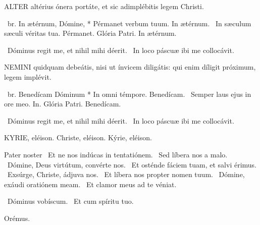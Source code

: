 


\lettrine[lines=2]{A}{LTER} altérius ónera portáte, et sic adimplébitis legem Christi.

\R\ br. In ætérnum, Dómine, * Pérmanet verbum tuum. In ætérnum. \V\ In sæculum sæculi véritas tua. Pérmanet. Glória Patri. In ætérnum.

\V\ Dóminus regit me, et nihil mihi déerit. \R\ In loco páscuæ ibi me collocávit.




\lettrine[lines=2]{N}{EMINI} quidquam debeátis, nisi ut ínvicem diligátis: qui enim díligit próximum, legem implévit.

\R\ br. Benedícam Dóminum * In omni témpore. Benedícam. \V\ Semper laus ejus in ore meo. In. Glória Patri. Benedícam.

\V\ Dóminus regit me, et nihil mihi déerit. \R\ In loco páscuæ ibi me collocávit.



KYRIE, eléison. Christe, eléison. Kýrie, eléison.

Pater noster  \V\ Et ne nos indúcas in tentatiónem. \R\ Sed líbera nos a malo. \V\ Dómine, Deus virtútum, convérte nos. \R\ Et osténde fáciem tuam, et salvi érimus. \V\ Exsúrge, Christe, ádjuva nos. \R\ Et líbera nos propter nomen tuum. \V\ Dómine, exáudi oratiónem meam. \R\ Et clamor meus ad te véniat.


\V\ Dóminus vobíscum. \R\ Et cum spíritu tuo.

Orémus.

